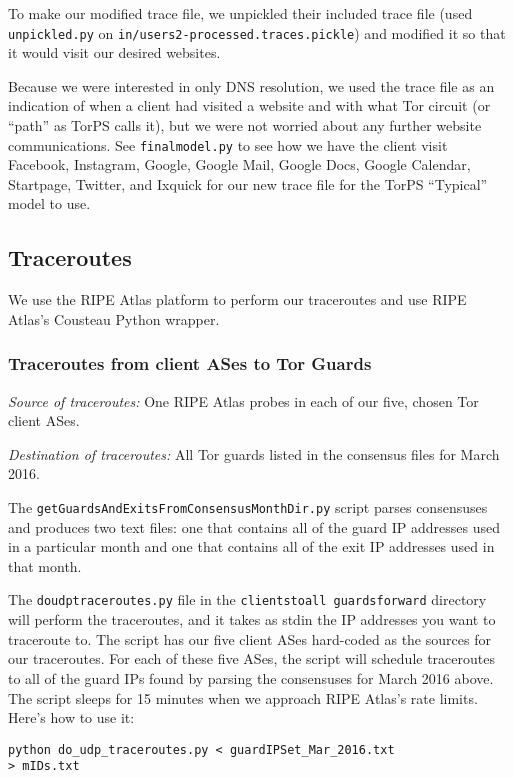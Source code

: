 \documentclass{article}
\begin{document}
To make our modified trace file, we unpickled their included trace file 
(used {\tt unpickled.py} on {\tt in/users2-processed.traces.pickle}) and 
modified it so that it would visit our desired websites.

Because we were interested in only DNS resolution, we used the trace file as an 
indication of when a client had visited a website and with what Tor circuit 
(or ``path'' as TorPS calls it), but we were not worried about any further 
website communications. 
See {\tt final\textunderscore model.py} to see how we have the 
client visit Facebook, Instagram, Google, Google Mail, Google Docs, 
Google Calendar, Startpage, Twitter, and Ixquick for our new trace 
file for the TorPS ``Typical'' model to use. 

\subsection{Traceroutes}
We use the RIPE Atlas platform to perform our traceroutes and use RIPE 
Atlas's Cousteau Python wrapper. 

\subsubsection{Traceroutes from client ASes to Tor Guards}
\emph{Source of traceroutes:} One RIPE Atlas probes in each of our five, chosen 
Tor client ASes.

\emph{Destination of traceroutes:} All Tor guards listed in the consensus 
files for March 2016.

The {\tt getGuardsAndExitsFromConsensusMonthDir.py} script parses consensuses 
and produces two text files: one that contains all of the guard IP addresses 
used in a particular month and one that contains all of the exit IP addresses 
used in that month.

The {\tt do\textunderscore udp\textunderscore traceroutes.py} file in the 
{\tt clients\textunderscore to\textunderscore all\textunderscore 
guards\textunderscore forward} directory will perform the traceroutes, and 
it takes as stdin the IP addresses you want to traceroute to. The script has 
our five client ASes hard-coded as the sources for our traceroutes. For each 
of these five ASes, the script will schedule traceroutes to all of the guard IPs 
found by parsing the consensuses for March 2016 above. The script sleeps for 
15 minutes when we approach RIPE Atlas's rate limits. Here's how to use it:
\begin{lstlisting}
python do_udp_traceroutes.py < guardIPSet_Mar_2016.txt 
> mIDs.txt
\end{lstlisting}
\end{document}
